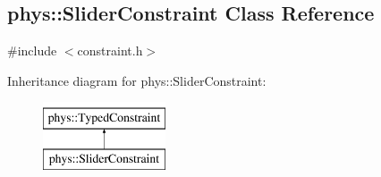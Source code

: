 \hypertarget{classphys_1_1SliderConstraint}{
\subsection{phys::SliderConstraint Class Reference}
\label{classphys_1_1SliderConstraint}
}


{\ttfamily \#include $<$constraint.h$>$}

Inheritance diagram for phys::SliderConstraint:\begin{figure}[H]
\begin{center}
\leavevmode
\includegraphics[height=2.000000cm]{classphys_1_1SliderConstraint}
\end{center}
\end{figure}
